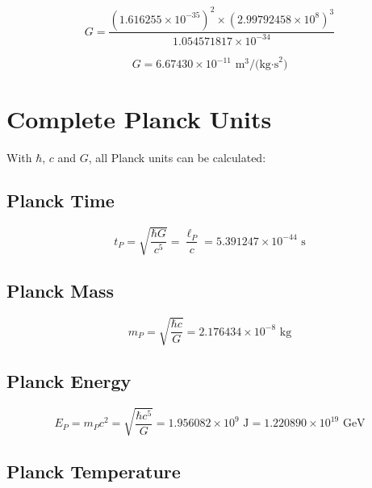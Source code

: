 	\begin{equation}
		G = \frac{(1.616255 \times 10^{-35})^2 \times (2.99792458 \times 10^8)^3}{1.054571817 \times 10^{-34}}
	\end{equation}
	
	\begin{tcolorbox}[colback=green!5!white,colframe=green!75!black,title=Gravitational Constant]
		\begin{equation}
			\boxed{G = 6.67430 \times 10^{-11} \text{ m}^3\text{/(kg·s}^2\text{)}}
		\end{equation}
	\end{tcolorbox}
	
	\section{Complete Planck Units}
	
	With $\hbar$, $c$ and $G$, all Planck units can be calculated:
	
	\subsection{Planck Time}
	
	\begin{equation}
		t_P = \sqrt{\frac{\hbar G}{c^5}} = \frac{\ell_P}{c} = 5.391247 \times 10^{-44} \text{ s}
	\end{equation}
	
	\subsection{Planck Mass}
	
	\begin{equation}
		m_P = \sqrt{\frac{\hbar c}{G}} = 2.176434 \times 10^{-8} \text{ kg}
	\end{equation}
	
	\subsection{Planck Energy}
	
	\begin{equation}
		E_P = m_P c^2 = \sqrt{\frac{\hbar c^5}{G}} = 1.956082 \times 10^9 \text{ J} = 1.220890 \times 10^{19} \text{ GeV}
	\end{equation}
	
	\subsection{Planck Temperature}
	
